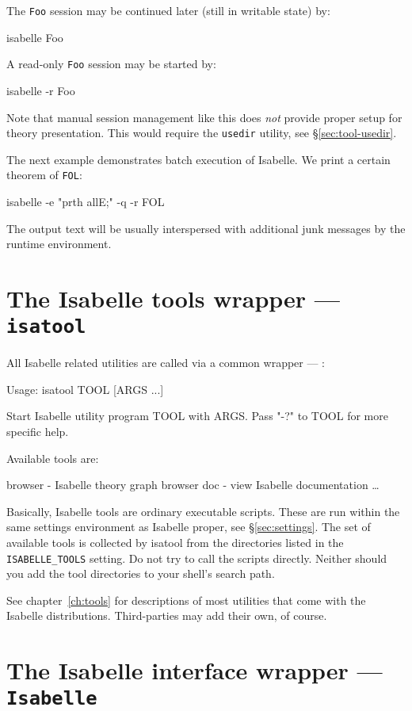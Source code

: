 The \texttt{Foo} session may be continued later (still in writable
state) by:
\begin{ttbox}
isabelle Foo
\end{ttbox}
A read-only \texttt{Foo} session may be started by:
\begin{ttbox}
isabelle -r Foo
\end{ttbox}

\medskip Note that manual session management like this does \emph{not} provide
proper setup for theory presentation.  This would require the \texttt{usedir}
utility, see \S\ref{sec:tool-usedir}.

\bigskip The next example demonstrates batch execution of Isabelle. We print a
certain theorem of \texttt{FOL}:
\begin{ttbox}
isabelle -e "prth allE;" -q -r FOL
\end{ttbox}
The output text will be usually interspersed with additional junk messages by
the {\ML} runtime environment.


\section{The Isabelle tools wrapper --- \texttt{isatool}} \label{sec:isatool}

All Isabelle related utilities are called via a common wrapper ---
:
\begin{ttbox}
Usage: isatool TOOL [ARGS ...]

  Start Isabelle utility program TOOL with ARGS. Pass "-?" to TOOL
  for more specific help.

  Available tools are:

    browser - Isabelle theory graph browser
    doc - view Isabelle documentation
    \dots
\end{ttbox}
Basically, Isabelle tools are ordinary executable scripts.  These are
run within the same settings environment as Isabelle proper, see
\S\ref{sec:settings}.  The set of available tools is collected by
isatool from the directories listed in the \texttt{ISABELLE_TOOLS}
setting.  Do not try to call the scripts directly. Neither should you
add the tool directories to your shell's search path.


\medskip See chapter~\ref{ch:tools} for descriptions of most utilities
that come with the Isabelle distributions. Third-parties may add their
own, of course.


\section{The Isabelle interface wrapper --- \texttt{Isabelle}} \label{sec:interface}

